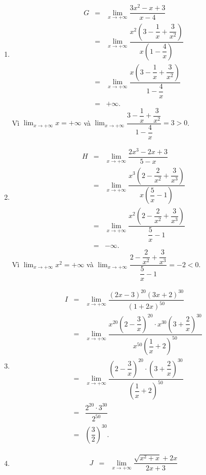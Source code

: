 \begin{ex}
{\begin{enumerate}
\begin{eqnarray*}
				 &=& -2.
			\end{eqnarray*}
			\item 
			\begin{eqnarray*}
				 G &=& \displaystyle\lim_{x \to +\infty} \dfrac{3x^2-x+3}{x-4} \\
				&=& \displaystyle\lim_{x \to +\infty} \dfrac{x^2\left(3-\dfrac{1}{x}+\dfrac{3}{x^2}\right)}{x\left(1-\dfrac{4}{x}\right)}  \\
				&=& \displaystyle\lim_{x \to  +\infty} \dfrac{x\left(3-\dfrac{1}{x}+\dfrac{3}{x^2}\right)}{1-\dfrac{4}{x}} \\
				&=& +\infty. 
			\end{eqnarray*}
			Vì $\displaystyle\lim_{x \to +\infty} x=+\infty$ và $\displaystyle\lim_{x \to  +\infty} \dfrac{3-\dfrac{1}{x}+\dfrac{3}{x^2}}{1-\dfrac{4}{x}}=3>0$.
			\item 
			\begin{eqnarray*}
				H &=& \displaystyle\lim_{x \to +\infty}  \dfrac{2x^3-2x+3}{5-x} \\
				&=& \displaystyle\lim_{x  \to +\infty} \dfrac{x^3\left(2-\dfrac{2}{x^2}+\dfrac{3}{x^3}\right)}{x\left(\dfrac{5}{x}-1\right)} \\
				&=& \displaystyle\lim_{x \to +\infty} \dfrac{x^2\left(2-\dfrac{2}{x^2}+\dfrac{3}{x^3}\right)}{\dfrac{5}{x}-1} \\ 
				&=&  -\infty.
			\end{eqnarray*}
			Vì $\displaystyle\lim_{x \to +\infty} x^2=+\infty$ và  $\displaystyle\lim_{x \to +\infty} \dfrac{2-\dfrac{2}{x^2}+\dfrac{3}{x^3}}{\dfrac{5}{x}-1}=-2<0$.
			 \item
			\begin{eqnarray*}
				 I &=& \displaystyle\lim_{x \to +\infty} \dfrac{(2x-3)^{20}(3x+2)^{30}}{(1+2x)^{50}} \\
				&=&\displaystyle\lim_{x \to +\infty}  \dfrac{x^{20}\left(2-\dfrac{3}{x}\right)^{20}\cdot x^{30}\left(3+\dfrac{2}{x}\right)^{30}}{x^{50}\left(\dfrac{1}{x}+2\right)^{50}} \\
				&=&\displaystyle\lim_{x \to  +\infty} \dfrac{\left(2-\dfrac{3}{x}\right)^{20}\cdot\left(3+\dfrac{2}{x}\right)^{30}}{\left(\dfrac{1}{x}+2\right)^{50}} \\
				 &=& \dfrac{2^{20}\cdot 3^{30}}{2^{50}}\\
				&=&\left(\dfrac{3}{2}\right)^{30}. 
			\end{eqnarray*}
			\item 
			\begin{eqnarray*}
				J &=& \displaystyle\lim_{x\to +\infty} \dfrac{\sqrt{x^2+x}+2x}{2x+3}\\ 

\end{eqnarray*}
\end{enumerate}}
\end{ex}
